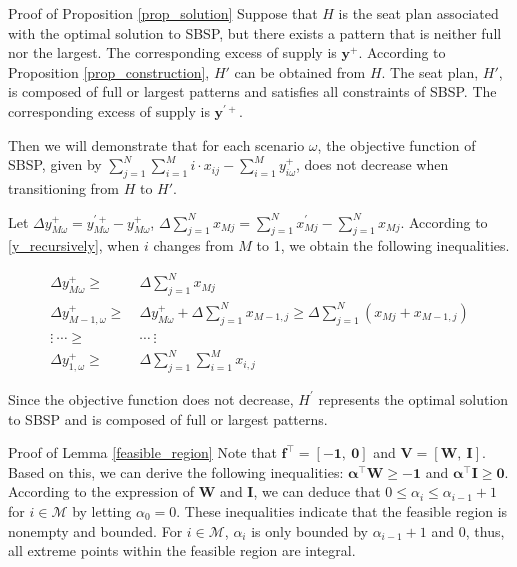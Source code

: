 \begin{pf}{Proof of Proposition \ref{prop_solution}}
Suppose that $H$ is the seat plan associated with the optimal solution to SBSP, but there exists a pattern that is neither full nor the largest. The corresponding excess of supply is $\mathbf{y}^{+}$. According to Proposition \ref{prop_construction}, $H{'}$ can be obtained from $H$. The seat plan, $H{'}$, is composed of full or largest patterns and satisfies all constraints of SBSP. The corresponding excess of supply is $\mathbf{y}^{'+}$.

Then we will demonstrate that for each scenario $\omega$, the objective function of SBSP, given by $\sum_{j =1}^{N} \sum_{i=1}^M i \cdot x_{ij} - \sum_{i = 1}^{M} y_{i \omega}^{+}$, does not decrease when transitioning from $H$ to $H'$.

Let $\Delta y_{M \omega}^{+} = y_{M \omega}^{'+} - y_{M \omega}^{+}$, $\Delta \sum_{j=1}^{N} x_{Mj} = \sum_{j=1}^{N} x_{Mj}^{'} - \sum_{j=1}^{N} x_{Mj}$. According to \eqref{y_recursively}, when $i$ changes from $M$ to 1, we obtain the following inequalities.

\begin{align*}
  \Delta y_{M \omega}^{+} \geq &~ \Delta \sum_{j=1}^{N} x_{Mj} \\
  \Delta y_{M-1, \omega}^{+} \geq &~ \Delta y_{M \omega}^{+} + \Delta \sum_{j=1}^{N} x_{M-1,j} \geq \Delta \sum_{j=1}^{N} (x_{Mj} + x_{M-1,j}) \\
  \vdots ~\cdots \geq & ~\cdots ~\vdots \\
  \Delta y_{1, \omega}^{+} \geq &~ \Delta \sum_{j=1}^{N} \sum_{i=1}^{M} x_{i,j}
\end{align*}

Since the objective function does not decrease, $H^{'}$ represents the optimal solution to SBSP and is composed of full or largest patterns.
\end{pf}

\begin{pf}{Proof of Lemma \ref{feasible_region}}
Note that $\mathbf{f}^{\intercal} = [-\mathbf{1},~\mathbf{0}]$ and $\mathbf{V} = [\mathbf{W},~\mathbf{I}]$. Based on this, we can derive the following inequalities: $\bm{\alpha}^{\intercal} \mathbf{W} \geq -\mathbf{1}$ and $\bm{\alpha}^{\intercal} \mathbf{I} \geq \mathbf{0}$. According to the expression of $\mathbf{W}$ and $\mathbf{I}$, we can deduce that $0 \leq \alpha_i \leq \alpha_{i-1} +1$ for $i \in \mathcal{M}$ by letting $\alpha_0 = 0$. These inequalities indicate that the feasible region is nonempty and bounded. For $i \in \mathcal{M}$, $\alpha_{i}$ is only bounded by $\alpha_{i-1}+1$ and $0$, thus, all extreme points within the feasible region are integral.
\end{pf}

